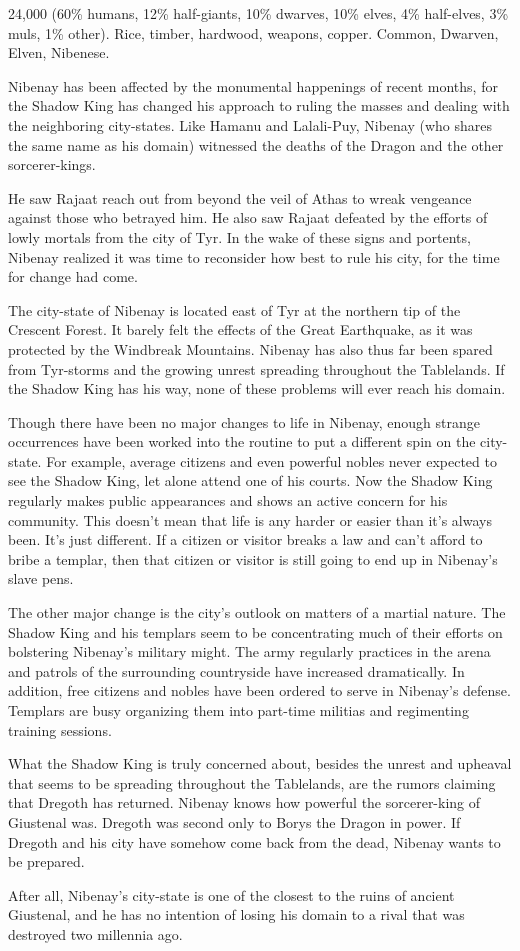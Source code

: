 {24,000 (60\% humans, 12\% half-giants, 10\% dwarves, 10\% elves, 4\% half-elves, 3\% muls, 1\% other).}
{Rice, timber, hardwood, weapons, copper.}
{Common, Dwarven, Elven, Nibenese.}
{
	Nibenay has been affected by the monumental happenings of recent months, for the Shadow King has changed his approach to ruling the masses and dealing with the neighboring city-states. Like Hamanu and Lalali-Puy, Nibenay (who shares the same name as his domain) witnessed the deaths of the Dragon and the other sorcerer-kings.

	He saw Rajaat reach out from beyond the veil of Athas to wreak vengeance against those who betrayed him. He also saw Rajaat defeated by the efforts of lowly mortals from the city of Tyr. In the wake of these signs and portents, Nibenay realized it was time to reconsider how best to rule his city, for the time for change had come.

	The city-state of Nibenay is located east of Tyr at the northern tip of the Crescent Forest. It barely felt the effects of the Great Earthquake, as it was protected by the Windbreak Mountains. Nibenay has also thus far been spared from Tyr-storms and the growing unrest spreading throughout the Tablelands. If the Shadow King has his way, none of these problems will ever reach his domain.
}
{
	Though there have been no major changes to life in Nibenay, enough strange occurrences have been worked into the routine to put a different spin on the city-state. For example, average citizens and even powerful nobles never expected to see the Shadow King, let alone attend one of his courts. Now the Shadow King regularly makes public appearances and shows an active concern for his community. This doesn't mean that life is any harder or easier than it's always been. It's just different. If a citizen or visitor breaks a law and can't afford to bribe a templar, then that citizen or visitor is still going to end up in Nibenay's slave pens.

	The other major change is the city's outlook on matters of a martial nature. The Shadow King and his templars seem to be concentrating much of their efforts on bolstering Nibenay's military might. The army regularly practices in the arena and patrols of the surrounding countryside have increased dramatically. In addition, free citizens and nobles have been ordered to serve in Nibenay's defense. Templars are busy organizing them into part-time militias and regimenting training sessions.

	What the Shadow King is truly concerned about, besides the unrest and upheaval that seems to be spreading throughout the Tablelands, are the rumors claiming that Dregoth has returned. Nibenay knows how powerful the sorcerer-king of Giustenal was. Dregoth was second only to Borys the Dragon in power. If Dregoth and his city have somehow come back from the dead, Nibenay wants to be prepared.

	After all, Nibenay's city-state is one of the closest to the ruins of ancient Giustenal, and he has no intention of losing his domain to a rival that was destroyed two millennia ago.
}

